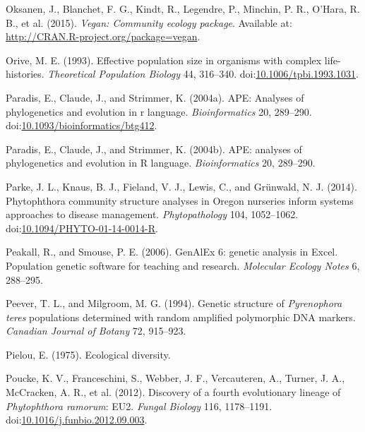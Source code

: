 \documentclass[double,12pt]{beavtex}
\begin{document}
  \hypertarget{ref-oksanen2015vegan}{}
  Oksanen, J., Blanchet, F. G., Kindt, R., Legendre, P., Minchin, P. R.,
  O'Hara, R. B., et al. (2015). \emph{Vegan: Community ecology package}.
  Available at: \url{http://CRAN.R-project.org/package=vegan}.
  
  \hypertarget{ref-orive1993effective}{}
  Orive, M. E. (1993). Effective population size in organisms with complex
  life-histories. \emph{Theoretical Population Biology} 44, 316--340.
  doi:\href{https://doi.org/10.1006/tpbi.1993.1031}{10.1006/tpbi.1993.1031}.
  
  \hypertarget{ref-paradis2004ape}{}
  Paradis, E., Claude, J., and Strimmer, K. (2004a). APE: Analyses of
  phylogenetics and evolution in r language. \emph{Bioinformatics} 20,
  289--290.
  doi:\href{https://doi.org/10.1093/bioinformatics/btg412}{10.1093/bioinformatics/btg412}.
  
  \hypertarget{ref-ape}{}
  Paradis, E., Claude, J., and Strimmer, K. (2004b). APE: analyses of
  phylogenetics and evolution in R language. \emph{Bioinformatics} 20,
  289--290.
  
  \hypertarget{ref-parke2014phytophthora}{}
  Parke, J. L., Knaus, B. J., Fieland, V. J., Lewis, C., and Grünwald, N.
  J. (2014). Phytophthora community structure analyses in Oregon nurseries
  inform systems approaches to disease management. \emph{Phytopathology}
  104, 1052--1062.
  doi:\href{https://doi.org/10.1094/PHYTO-01-14-0014-R}{10.1094/PHYTO-01-14-0014-R}.
  
  \hypertarget{ref-Peakall:2006}{}
  Peakall, R., and Smouse, P. E. (2006). GenAlEx 6: genetic analysis in
  Excel. Population genetic software for teaching and research.
  \emph{Molecular Ecology Notes} 6, 288--295.
  
  \hypertarget{ref-peever1994genetic}{}
  Peever, T. L., and Milgroom, M. G. (1994). Genetic structure of
  \emph{Pyrenophora teres} populations determined with random amplified
  polymorphic DNA markers. \emph{Canadian Journal of Botany} 72, 915--923.
  
  \hypertarget{ref-pielou1975ecological}{}
  Pielou, E. (1975). Ecological diversity.
  
  \hypertarget{ref-vanpoucke2012discovery}{}
  Poucke, K. V., Franceschini, S., Webber, J. F., Vercauteren, A., Turner,
  J. A., McCracken, A. R., et al. (2012). Discovery of a fourth
  evolutionary lineage of \emph{Phytophthora ramorum}: EU2. \emph{Fungal
  Biology} 116, 1178--1191.
  doi:\href{https://doi.org/10.1016/j.funbio.2012.09.003}{10.1016/j.funbio.2012.09.003}.
  
\end{document}
